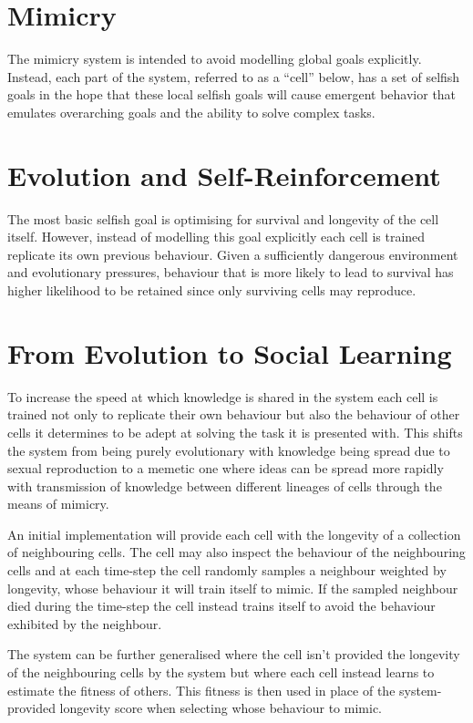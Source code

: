 \documentclass[a4paper]{article}
\begin{document}
\frenchspacing

\section{Mimicry}

The mimicry system is intended to avoid modelling global goals explicitly.
%
Instead, each part of the system, referred to as a ``cell'' below, has a set of selfish goals in the hope that these local selfish goals will cause emergent behavior that emulates overarching goals and the ability to solve complex tasks.

\section{Evolution and Self-Reinforcement}

The most basic selfish goal is optimising for survival and longevity of the cell itself. 
%
However, instead of modelling this goal explicitly each cell is trained replicate its own previous behaviour.
%
Given a sufficiently dangerous environment and evolutionary pressures, behaviour that is more likely to lead to survival has higher likelihood to be retained since only surviving cells may reproduce.

\section{From Evolution to Social Learning}

To increase the speed at which knowledge is shared in the system each cell is trained not only to replicate their own behaviour but also the behaviour of other cells it determines to be adept at solving the task it is presented with.
%
This shifts the system from being purely evolutionary with knowledge being spread due to sexual reproduction to a memetic one where ideas can be spread more rapidly with transmission of knowledge between different lineages of cells through the means of mimicry.

An initial implementation will provide each cell with the longevity of a collection of neighbouring cells.
%
The cell may also inspect the behaviour of the neighbouring cells and at each time-step the cell randomly samples a neighbour weighted by longevity, whose behaviour it will train itself to mimic.
%
If the sampled neighbour died during the time-step the cell instead trains itself to avoid the behaviour exhibited by the neighbour.

The system can be further generalised where the cell isn't provided the longevity of the neighbouring cells by the system but where each cell instead learns to estimate the fitness of others.
%
This fitness is then used in place of the system-provided longevity score when selecting whose behaviour to mimic.
\end{document}
